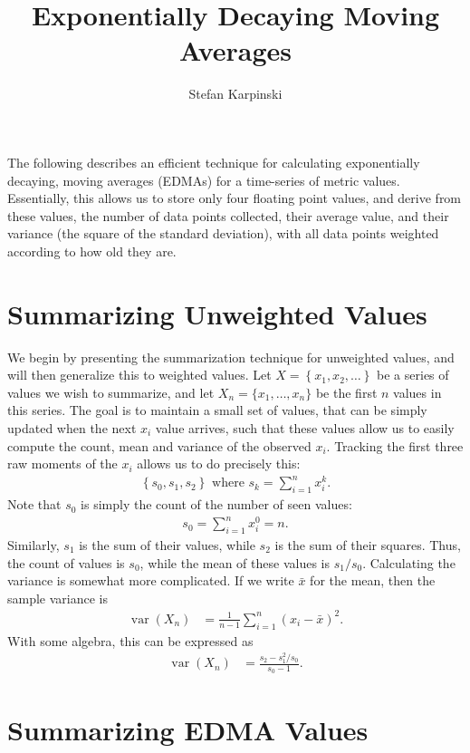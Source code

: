 \documentclass{article}
\title{Exponentially Decaying Moving Averages}
\author{Stefan Karpinski}
\DeclareMathOperator{\var}{var}
\begin{document}
\maketitle

The following describes an efficient technique for calculating exponentially decaying, moving averages (EDMAs) for a time-series of metric values. Essentially, this allows us to store only four floating point values, and derive from these values, the number of data points collected, their average value, and their variance (the square of the standard deviation), with all data points weighted according to how old they are.

\section{Summarizing Unweighted Values}

We begin by presenting the summarization technique for unweighted values, and will then generalize this to weighted values. Let $X=\left\{x_1,x_2,\dots\right\}$ be a series of values we wish to summarize, and let $X_n=\{x_1,\dots,x_n\}$ be the first $n$ values in this series. The goal is to maintain a small set of values, that can be simply updated when the next $x_i$ value arrives, such that these values allow us to easily compute the count, mean and variance of the observed $x_i$. Tracking the first three raw moments of the $x_i$ allows us to do precisely this:
\begin{align}
\left\{s_0, s_1, s_2\right\} \text{ where } s_k = \sum_{i=1}^{n}{x_i^k}.
\end{align}
Note that $s_0$ is simply the count of the number of seen values:
\begin{align}
s_0 = \sum_{i=1}^{n}{x_i^0} = n.
\end{align}
Similarly, $s_1$ is the sum of their values, while $s_2$ is the sum of their squares. Thus, the count of values is $s_0$, while the mean of these values is $s_1/s_0$. Calculating the variance is somewhat more complicated. If we write $\bar{x}$ for the mean, then the sample variance is
\begin{align}
\var(X_n) &= \frac{1}{n-1} \sum_{i=1}^{n}(x_i-\bar{x})^2.
\end{align}
With some algebra, this can be expressed as
\begin{align}
\var(X_n) &= \frac{s_2 - s_1^2/s_0}{s_0-1}.
\end{align}

\section{Summarizing EDMA Values}\label{sec:summarization-edma}
\end{document}
